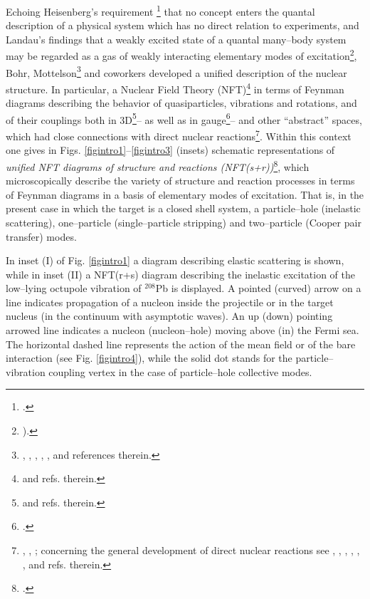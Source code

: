 Echoing Heisenberg's requirement \footnote{\cite{Heisenberg:49}.} that no concept enters the quantal description of a physical system which has no direct relation to experiments, and Landau's findings that a weakly excited state of a quantal many--body system may be regarded as a gas of weakly interacting elementary modes of excitation\footnote{\cite{Landau:41}).}, Bohr, Mottelson\footnote{\cite{Bohr:64}, \cite{Bohr:69}, \cite{Bohr:76}, \cite{Mottelson:76}, \cite{Bohr:75}, \cite{Bohr:58} and references therein.} and coworkers developed a unified description of the nuclear  structure. In particular, a Nuclear Field Theory (NFT)\footnote{\cite{Bes:74,Bohr:75,Bes:90,Mottelson:76} and refs. therein.} in terms of Feynman diagrams describing the behavior of quasiparticles, vibrations and rotations, and of their couplings both in 3D\footnote{\cite{Nilsson:55,Bohr:75} and refs. therein.}-- as well as in gauge\footnote{\cite{Bohr:58,Belyaev:59,Hogassen:61,Bjerregaard:66b,Broglia:67,Bohr:75}.}-- and other ``abstract'' spaces, which had  close connections with direct nuclear reactions\footnote{ \cite{Alder:56}, \cite{Alder:75}, \cite{Broglia:04a}; concerning the general development of direct nuclear reactions see \cite{Austern:70}, \cite{Jackson:70}, \cite{Satchler:80}, \cite{Satchler:83}, \cite{Brink:85}, \cite{Glendenning:04,Thompson:09}, and refs. therein.}. Within this context one gives in Figs. \ref{figintro1}--\ref{figintro3} (insets)  schematic representations of  \textit{unified NFT diagrams of structure and reactions (NFT(s+r))}\footnote{\cite{Broglia:75,Broglia:04a,Potel:13,Broglia:16}.}, which microscopically describe the variety of structure and reaction processes in terms of Feynman diagrams in a basis of elementary modes of excitation. That is, in the present case in which the target is a closed shell system, a particle--hole (inelastic scattering), one--particle (single--particle stripping) and two--particle (Cooper pair transfer) modes. 

In inset (I) of Fig. \ref{figintro1} a diagram describing elastic scattering is shown, while in inset (II) a NFT(r+s) diagram describing the inelastic excitation of the low--lying octupole vibration of $^{208}$Pb is displayed. A pointed (curved) arrow on a line indicates propagation of a nucleon inside the projectile or in the target nucleus (in the continuum with asymptotic waves). An up (down) pointing arrowed line indicates a nucleon (nucleon--hole) moving above (in) the Fermi sea. The horizontal dashed line represents the action of the mean field or of the  bare interaction (see Fig. \ref{figintro4}), while the solid dot stands for the particle--vibration coupling vertex in the case of particle--hole collective modes. 



